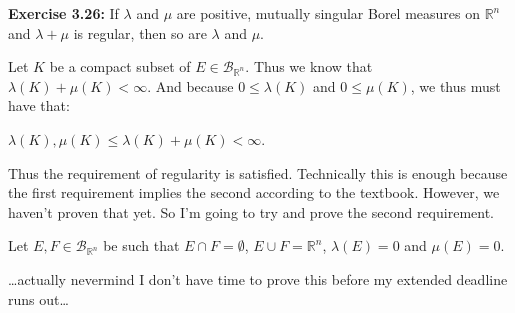 \documentclass{book}
\newcommand{\exTwoP}{%
   \color{RedViolet}%
   \fontsize{13}{15}\selectfont%
}
\newenvironment{myIndent}{%
   \begin{adjustwidth}{2.5em}{0em}%
}{%
   \end{adjustwidth}%
}
\newcommand{\blab}[1]{\textbf{#1}}
\newcommand{\retTwo}{\hfill\bigbreak}
\begin{document}
\blab{Exercise 3.26:} If $\lambda$ and $\mu$ are positive, mutually singular Borel measures on $\mathbb{R}^n$ and $\lambda + \mu$ is regular, then so are $\lambda$ and $\mu$.

\begin{myIndent}\exTwoP
	Let $K$ be a compact subset of $E \in \mathcal{B}_{\mathbb{R}^n}$. Thus we know that $\lambda(K) + \mu(K) < \infty$. And because $0 \leq \lambda(K)$ and $0 \leq \mu(K)$, we thus must have that:
	
	{\centering $\lambda(K), \mu(K) \leq \lambda(K) + \mu(K) <\infty$.\retTwo\par}

	Thus the requirement of regularity is satisfied. Technically this is enough because the first requirement implies the second according to the textbook. However, we haven't proven that yet. So I'm going to try and prove the second requirement.\retTwo

	Let $E, F \in \mathcal{B}_{\mathbb{R}^n}$ be such that $E \cap F = \emptyset$, $E \cup F = \mathbb{R}^n$, $\lambda(E) = 0$ and $\mu(E) = 0$.\retTwo

	\dots actually nevermind I don't have time to prove this before my extended deadline runs out\dots
\end{myIndent}


\end{document}
